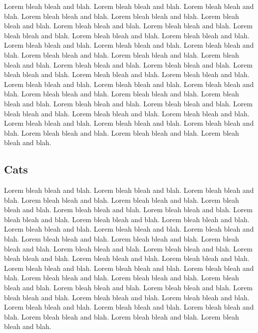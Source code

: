 \documentclass[letterpaper,10pt]{article}
\begin{document}
Lorem bleah bleah and blah. Lorem bleah bleah and blah. Lorem bleah
bleah and blah. Lorem bleah bleah and blah. Lorem bleah bleah and
blah. Lorem bleah bleah and blah. Lorem bleah bleah and blah. Lorem
bleah bleah and blah. Lorem bleah bleah and blah. Lorem bleah bleah
and blah. Lorem bleah bleah and blah. Lorem bleah bleah and blah.
Lorem bleah bleah and blah. Lorem bleah bleah and blah. Lorem bleah
bleah and blah. Lorem bleah bleah and blah. Lorem bleah bleah and
blah. Lorem bleah bleah and blah. Lorem bleah bleah and blah. Lorem
bleah bleah and blah. Lorem bleah bleah and blah. Lorem bleah bleah
and blah. Lorem bleah bleah and blah. Lorem bleah bleah and blah.
Lorem bleah bleah and blah. Lorem bleah bleah and blah. Lorem bleah
bleah and blah. Lorem bleah bleah and blah. Lorem bleah bleah and
blah. Lorem bleah bleah and blah. Lorem bleah bleah and blah. Lorem
bleah bleah and blah. Lorem bleah bleah and blah. Lorem bleah bleah
and blah. Lorem bleah bleah and blah. Lorem bleah bleah and blah.
Lorem bleah bleah and blah. Lorem bleah bleah and blah. Lorem bleah
bleah and blah.

\subsection{Cats}

Lorem bleah bleah and blah. Lorem bleah bleah and blah. Lorem bleah
bleah and blah. Lorem bleah bleah and blah. Lorem bleah bleah and
blah. Lorem bleah bleah and blah. Lorem bleah bleah and blah. Lorem
bleah bleah and blah. Lorem bleah bleah and blah. Lorem bleah bleah
and blah. Lorem bleah bleah and blah. Lorem bleah bleah and blah.
Lorem bleah bleah and blah. Lorem bleah bleah and blah. Lorem bleah
bleah and blah. Lorem bleah bleah and blah. Lorem bleah bleah and
blah. Lorem bleah bleah and blah. Lorem bleah bleah and blah. Lorem
bleah bleah and blah. Lorem bleah bleah and blah. Lorem bleah bleah
and blah. Lorem bleah bleah and blah. Lorem bleah bleah and blah.
Lorem bleah bleah and blah. Lorem bleah bleah and blah. Lorem bleah
bleah and blah. Lorem bleah bleah and blah. Lorem bleah bleah and
blah. Lorem bleah bleah and blah. Lorem bleah bleah and blah. Lorem
bleah bleah and blah. Lorem bleah bleah and blah. Lorem bleah bleah
and blah. Lorem bleah bleah and blah. Lorem bleah bleah and blah.
Lorem bleah bleah and blah. Lorem bleah bleah and blah. Lorem bleah
bleah and blah.
\end{document}
